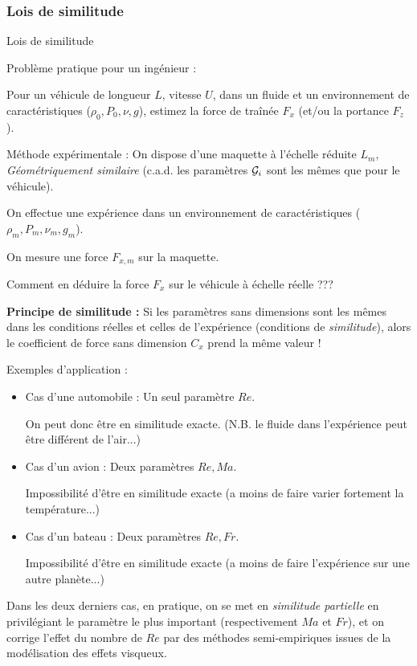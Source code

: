 \subsubsection{Lois de similitude}
\begin{frame}{Lois de similitude}

\small

Problème pratique pour un ingénieur : 

Pour un véhicule de longueur $L$, vitesse $U$, dans un fluide et un environnement de caractéristiques ($\rho_0,P_0,\nu,g$), estimez la force de traînée $F_x$ (et/ou la portance $F_z$).

\pause
\medskip

Méthode expérimentale : On dispose d'une maquette à l'échelle réduite 
$L_m$,  {\em Géométriquement similaire} (c.a.d. les paramètres ${\cal G}_i$ sont les mêmes que pour le véhicule). 

On effectue une expérience dans un environnement de caractéristiques ($\rho_m,P_m,\nu_m,g_m$).

\smallskip

On mesure une force $F_{x,m}$ sur la maquette. 
\smallskip

Comment en déduire la force $F_x$ sur le véhicule à échelle réelle ???

\pause
\medskip


{\bf Principe de similitude :} 
Si les paramètres sans dimensions sont les mêmes dans les conditions réelles et celles de l'expérience (conditions de {\em similitude}), alors le coefficient de force sans dimension $C_x$ prend la même valeur !

\pause
\medskip

Exemples d'application :
\begin{itemize}

\item Cas d'une automobile : Un seul paramètre $Re$. 

On peut donc être en similitude exacte. (N.B. le fluide dans l'expérience peut être différent de l'air...)

\item Cas d'un avion : Deux paramètres $Re, Ma$. 

Impossibilité d'être en similitude exacte (a moins de faire varier fortement la température...)

\item Cas d'un bateau :  Deux paramètres $Re, Fr$. 

Impossibilité d'être en similitude exacte (a moins de faire l'expérience sur une autre planète...)

\end{itemize}


\pause
\medskip

Dans les deux derniers cas, en pratique, on se met en {\em similitude partielle } en privilégiant le paramètre le plus important (respectivement $Ma$ et $Fr$), et on corrige l'effet du nombre de $Re$ par des méthodes semi-empiriques issues de la modélisation des effets visqueux.

\end{frame}





